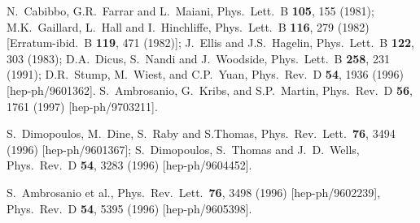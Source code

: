 \documentclass[12pt]{article}
\begin{document}
\begin{thebibliography}{999}
N.~Cabibbo, G.R.~Farrar and L.~Maiani,
  Phys.\ Lett.\ B {\bf 105}, 155 (1981);
M.K.~Gaillard, L.~Hall and I.~Hinchliffe, 
  Phys.\ Lett.\ B {\bf 116}, 279 (1982)
  [Erratum-ibid.\ B {\bf 119}, 471 (1982)];
J.~Ellis and J.S.~Hagelin, 
  Phys.\ Lett.\ B {\bf 122}, 303 (1983);
D.A.~Dicus, S.~Nandi and J.~Woodside, 
  Phys.\ Lett.\ B {\bf 258}, 231 (1991);
D.R.~Stump, M.~Wiest, and C.P.~Yuan, 
  Phys.\ Rev.\ D {\bf 54}, 1936 (1996)
  [hep-ph/9601362].
S.~Ambrosanio, G.~Kribs, and S.P.~Martin, 
  Phys.\ Rev.\ D {\bf 56}, 1761 (1997)
  [hep-ph/9703211].

S.~Dimopoulos, M.~Dine, S.~Raby and S.Thomas,
  Phys.\ Rev.\ Lett.\  {\bf 76}, 3494 (1996)
  [hep-ph/9601367];
S.~Dimopoulos, S.~Thomas and J.~D.~Wells,
  Phys.\ Rev.\ D {\bf 54}, 3283 (1996)
  [hep-ph/9604452].

S.~Ambrosanio et al.,
  Phys.\ Rev.\ Lett.\  {\bf 76}, 3498  (1996)
  [hep-ph/9602239],
  Phys.\ Rev.\ D {\bf 54}, 5395 (1996)
  [hep-ph/9605398].


\end{thebibliography}
\end{document}
